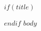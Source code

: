 \documentclass[12pt, a5paper]{extarticle}
\date{}
\begin{document}
$if(title)$
{\let\cleardoublepage\clearpage
\maketitle
}
$endif$
$body$
\end{document}
